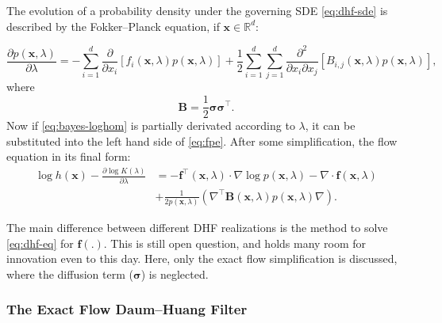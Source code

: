 The evolution of a probability density under the governing SDE \eqref{eq:dhf-sde} is described by the Fokker--Planck equation, if $\mathbf{x} \in \mathbb{R}^d$:

\begin{equation}\label{eq:fpe}
    \frac{\partial p(\mathbf{x},\lambda)}{\partial \lambda} = -\sum_{i = 1}^{d}\frac{\partial}{\partial x_i}\left[f_i(\mathbf{x},\lambda)p(\mathbf{x},\lambda)\right] + \frac{1}{2}\sum_{i = 1}^{d}\sum_{j = 1}^{d}\frac{\partial^2}{\partial x_i \partial x_j}\left[B_{i,j}(\mathbf{x},\lambda)p(\mathbf{x},\lambda)\right],
\end{equation}
where
\begin{equation}\label{key}
    \mathbf{B} = \frac{1}{2}\boldsymbol\sigma\boldsymbol\sigma^\top.
\end{equation}
Now if \eqref{eq:bayes-loghom} is partially derivated according to $\lambda$, it can be substituted into the left hand side of \eqref{eq:fpe}. After some simplification, the flow equation in its final form:
\begin{align}\label{eq:dhf-eq}
    \log h(\mathbf{x}) - \frac{\partial \log K(\lambda)}{\partial \lambda} & = -\mathbf{f}^\top(\mathbf{x},\lambda)\cdot\nabla\log p(\mathbf{x},\lambda) - \nabla\cdot \mathbf{f}(\mathbf{x},\lambda)       \\
                                                                           & + \frac{1}{2p(\mathbf{x},\lambda)}\left(\nabla^\top\mathbf{B}(\mathbf{x},\lambda)p(\mathbf{x},\lambda)\nabla\right). \nonumber
\end{align}

The main difference between different DHF realizations is the method to solve \eqref{eq:dhf-eq} for $\mathbf{f}(.)$. This is still open question, and holds many room for innovation even to this day.  Here, only the exact flow simplification \cite{Daum2010} is discussed, where the diffusion term ($\boldsymbol\sigma$) is neglected.

\subsubsection{The Exact Flow Daum--Huang Filter}

